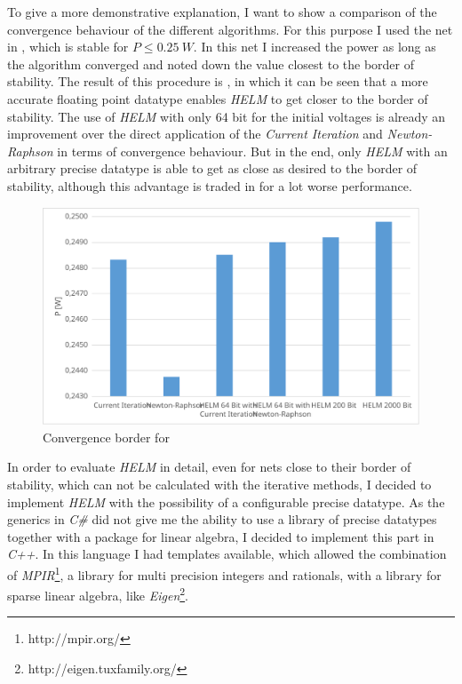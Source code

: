 To give a more demonstrative explanation, I want to show a comparison of the convergence behaviour of the different algorithms. For this purpose I used the net in , which is stable for $P \le \SI{0.25}{W}$. In this net I increased the power as long as the algorithm converged and noted down the value closest to the border of stability. The result of this procedure is , in which it can be seen that a more accurate floating point datatype enables \emph{HELM} to get closer to the border of stability. The use of \emph{HELM} with only 64 bit for the initial voltages is already an improvement over the direct application of the \emph{Current Iteration} and \emph{Newton-Raphson} in terms of convergence behaviour. But in the end, only \emph{HELM} with an arbitrary precise datatype is able to get as close as desired to the border of stability, although this advantage is traded in for a lot worse performance.

\begin{figure}
	\centering
	\includegraphics[scale=0.7]{figures/convergence_border}
	\caption{Convergence border for }
	\label{fig:convergence_border}
\end{figure}

In order to evaluate \emph{HELM} in detail, even for nets close to their border of stability, which can not be calculated with the iterative methods, I decided to implement \emph{HELM} with the possibility of a configurable precise datatype. As the generics in \emph{C\#} did not give me the ability to use a library of precise datatypes together with a package for linear algebra, I decided to implement this part in \emph{C++}. In this language I had templates available, which allowed the combination of \emph{MPIR}\footnote{http://mpir.org/}, a library for multi precision integers and rationals, with a library for sparse linear algebra, like \emph{Eigen}\footnote{http://eigen.tuxfamily.org/}.

